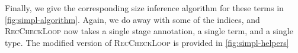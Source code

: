 \documentclass[acmsmall,screen,review,10pt]{acmart} %
\begin{document}


Finally, we give the corresponding size inference algorithm for these terms in \autoref{fig:simpl-algorithm}. Again, we do away with some of the indices, and \textsc{RecCheckLoop} now takes a single stage annotation, a single term, and a single type. The modified version of \textsc{RecCheckLoop} is provided in \autoref{fig:simpl-helpers}



\end{document}
